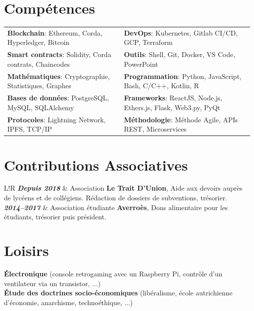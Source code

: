 \documentclass[10pt]{article}
\newcommand\VRule{\color{lightgray}\vrule width 2pt}
\begin{document}
\section*{Compétences}
\begin{tabular}{ l l }
\textbf{Blockchain}: Ethereum, Corda, Hyperledger, Bitcoin & \textbf{DevOps}: Kubernetes, Gitlab CI/CD, GCP, Terraform \\[0.1cm]
\textbf{Smart contracts}: Solidity, Corda contrats, Chaincodes & \textbf{Outils}: Shell, Git, Docker, VS Code, PowerPoint \\[0.1cm]
\textbf{Mathématiques}: Cryptographie, Statistiques, Graphes & \textbf{Programmation}: Python, JavaScript, Bash, C/C++, Kotlin, R \\[0.1cm]
\textbf{Bases de données}: PostgreSQL, MySQL, SQLAlchemy & \textbf{Frameworks}: ReactJS, Node.js, Ethers.js, Flask, Web3.py, PyQt \\[0.1cm]
\textbf{Protocoles}: Lightning Network, IPFS, TCP/IP & \textbf{Méthodologie}: Méthode Agile, APIs REST, Microservices \\[0.1cm]
\end{tabular}

\section*{Contributions Associatives}
\begin{tabular}{L!{\VRule}R}
\textbf{\textit{Depuis 2018}} & Association \textbf{Le Trait D’Union}, Aide aux devoirs auprès de lycéens et de collégiens. Rédaction de dossiers de subventions, trésorier. \\[0.75cm]

\textbf{\textit{2014--2017}} & Association étudiante \textbf{Averroès}, Dons alimentaire pour les étudiants, trésorier puis président. \\
\end{tabular}
\section*{Loisirs}
\hspace*{1ex} \textbf{Électronique} (console retrogaming avec un Raspberry Pi, contrôle d'un ventilateur via un transistor, ...) \\
\hspace*{1ex} \textbf{Étude des doctrines socio-économiques} (libéralisme, école autrichienne d'économie, anarchisme, technoéthique, ...) \\
\end{document}

